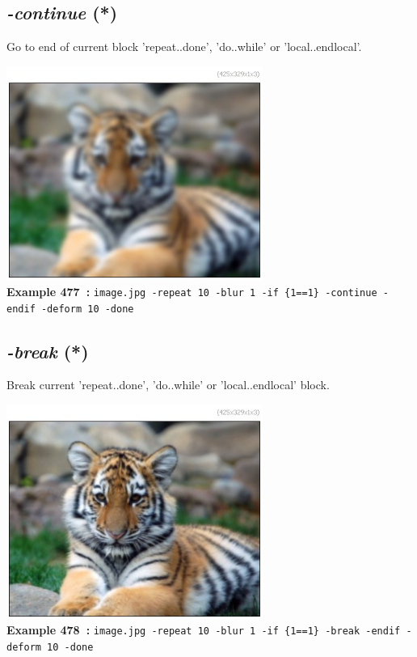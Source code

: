 \documentclass[a4paper,11pt,twoside]{book}
\begin{document}
\subsection{\emph{-continue} (*)}\vspace*{-0.5em}
Go to end of current block 'repeat..done', 'do..while' or 'local..endlocal'.
\begin{center}\includegraphics[keepaspectratio=true,height=7cm,width=\textwidth]{img/gmic_def477.jpg}\\
{\footnotesize \textbf{Example 477~:} \texttt{image.jpg -repeat 10 -blur 1 -if \{1==1\} -continue -endif -deform 10 -done}}
\end{center}

\subsection{\emph{-break} (*)}\vspace*{-0.5em}
Break current 'repeat..done', 'do..while' or 'local..endlocal' block.
\begin{center}\includegraphics[keepaspectratio=true,height=7cm,width=\textwidth]{img/gmic_def478.jpg}\\
{\footnotesize \textbf{Example 478~:} \texttt{image.jpg -repeat 10 -blur 1 -if \{1==1\} -break -endif -deform 10 -done}}
\end{center}
\end{document}
